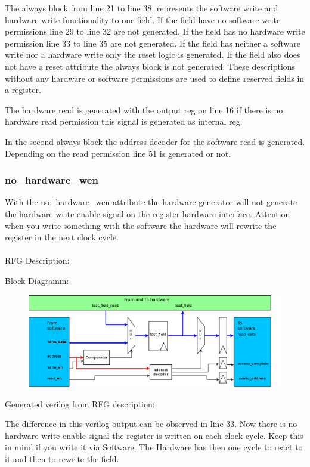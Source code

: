 \documentclass[12pt,a4paper]{article}
\begin{document}
The always block from line 21 to line 38, represents the software write and hardware write functionality to one field. If the field have no software write permissions line 29 to line 32 are not generated. If the field has no hardware write permission line 33 to line 35 are not generated. If the field has neither a software write nor a hardware write only the reset logic is generated. If the field also does not have a reset attribute the always block is not generated. These descriptions without any hardware or software permissions are used to define reserved fields in a register.

The hardware read is generated with the output reg on line 16 if there is no hardware read permission this signal is generated as internal reg.

In the second always block the address decoder for the software read is generated. Depending on the read permission line 51 is generated or not.

\newpage

\subsubsection{no\_hardware\_wen}

With the no\_hardware\_wen attribute the hardware generator will not generate the hardware write enable signal on the register hardware interface. Attention when you write something with the software the hardware will rewrite the register in the next clock cycle.\\
\\
RFG Description:


Block Diagramm:
\begin{figure}[h!]
\includegraphics[width=\textwidth]{pictures/Reg_hrw_srw_nhwen.png}
\end{figure}
\newpage
Generated verilog from RFG description:

The difference in this verilog output can be observed in line 33. Now there is no hardware write enable signal the register is written on each clock cycle. Keep this in mind if you write it via Software. The Hardware has then one cycle to react to it and then to rewrite the field.
\newpage
\end{document}
